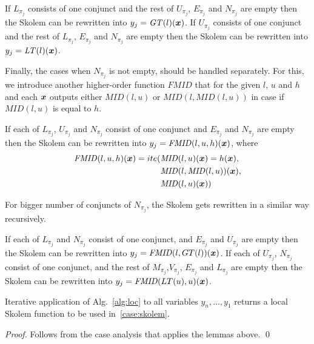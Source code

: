 \begin{lemma}
If $L_{\pi_j}$ consists of one conjunct and the rest of $U_{\pi_j}$, $E_{\pi_j}$ and $N_{\pi_j}$ are empty then the Skolem can be rewritten into $y_j = \mathit{GT} (l)(\vx)$.
If $U_{\pi_j}$ consists of one conjunct and the rest of $L_{\pi_j}$, $E_{\pi_j}$ and $N_{\pi_j}$ are empty then the Skolem can be rewritten into $y_j = \mathit{LT} (l)(\vx)$.
\end{lemma}

Finally, the cases when $N_{\pi_j}$ is not empty, should be handled separately.
For this, we introduce another higher-order function $\mathit{FMID}$  that for the given $l$, $u$ and $h$ and each $\vx$ outputs either $\mathit{MID}(l,u)$ or  $\mathit{MID}(l,\mathit{MID}(l,u))$ in case if $\mathit{MID}(l,u)$ is equal to $h$.

\begin{lemma}
If each of $L_{\pi_j}$, $U_{\pi_j}$ and $N_{\pi_j}$ consist of one conjunct and $E_{\pi_j}$ and $N_{\pi_j}$ are empty then the Skolem can be rewritten into $y_j = \mathit{FMID} (l, u, h)(\vx)$, where%
\begin{align}
\mathit{FMID}(l, u, h) (\vx) = ite (&\mathit{MID}(l, u) (\vx) = h(\vx),  \notag \\
                          &\mathit{MID}(l, \mathit{MID}(l, u)) (\vx), \notag \\
                          &\mathit{MID}(l, u) (\vx)) \notag 
\end{align}
\end{lemma}
For bigger number of conjuncts of $N_{\pi_j}$, the Skolem gets rewritten
in a similar way recursively.


\begin{lemma}
If each of $L_{\pi_j}$ and $N_{\pi_j}$  consist of one conjunct, and $E_{\pi_j}$ and $U_{\pi_j}$ are empty then the Skolem can be rewritten into $y_j = \mathit{FMID} (l, GT(l))(\vx)$. 
If each of $U_{\pi_j}$, $N_{\pi_j}$  consist of one conjunct, and the rest of $M_{\pi_j} $,$V_{\pi_j}$, $E_{\pi_j}$ and $L_{\pi_j}$ are empty then the Skolem can be rewritten into $y_j = \mathit{FMID} (LT(u), u)(\vx)$. 
\end{lemma}


\begin{theorem}[Soundness]
Iterative application of Alg.~\ref{alg:loc} to all variables $y_n,\ldots,y_1$ returns a local Skolem function to be used in~\eqref{case:skolem}.
\end{theorem}
\begin{proof}
Follows from the case analysis that applies the lemmas above.
\qed
\end{proof}

